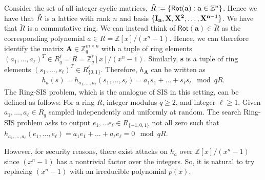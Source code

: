 \documentclass[cryptography,review,submit,pdftex,moreauthors,amsmath,amssymb,aps,strict]{Definitions/mdpi}
\begin{document}
\noindent Consider the set of all integer cyclic matrices, $\Tilde{R}:=\{\mathsf{Rot}(\mathbf{a}):\mathbf{a}\in\mathbb{Z}^n\}$. Hence we have that $\Tilde{R}$ is a lattice with rank $n$ and basis $\{\bf{I}_n,\bf{X},\bf{X}^2,\dots,\bf{X}^{n-1}\}$. We have that $\tilde{R}$ is a commutative ring. We can instead think of $\mathsf{Rot}(\mathbf{a})\in\tilde{R}$ as the corresponding polynomial $a\in R=\mathbb{Z}[x]/(x^n-1)$. Hence, we can therefore identify the matrix $\mathbf{A}\in\mathbb{Z}_q^{m \times n}$ with a tuple of ring elements $(a_1,\dots,a_{\ell})^T\in R^{\ell}_q= R=\mathbb{Z}^{\ell}_q[x]/(x^n-1)$. Similarly, $\mathbf{s}$ is a tuple of ring elements $(s_1,\dots,s_{\ell})^T\in R^{\ell}_{\{0,1\}}$.
    Therefore, $h_{\mathbf{A}}$ can be written as 
\begin{align}
    h_a(s)=h_{a_1,\dots,a_{\ell}}(s_1,\dots,s_{\ell})=a_1s_1+\dots+s_{\ell}s_{\ell}\mod qR.
\end{align}
     The Ring-SIS problem, which is the analogue of SIS in this setting, can be defined as follows: For a ring $R$, integer modulus $q\geq 2$, and integer $\ell\geq 1$. Given $a_1,\dots, a_{\ell}\in R_q$ sampled independently and uniformly at random. The search Ring-SIS problem asks to output $e_1,\dots e_{\ell}\in R_{\{-1,0,1\}}$ not all zero such that $h_{a_1,\dots,a_{\ell}}(e_1,\dots,e_{\ell})=a_1e_1+\dots+a_{\ell}e_{\ell} = 0\mod qR$.


    However, for security reasons, there exist attacks on $h_a$ over $\mathbb{Z}[x]/(x^n-1)$ since $(x^n-1)$ has a nontrivial factor over the integers. So, it is natural to try replacing $(x^n-1)$ with an irreducible polynomial $p(x)$. 
\end{document}
